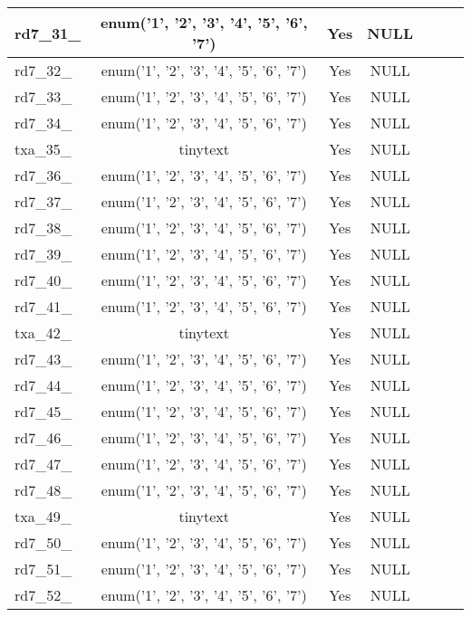 \begin{longtable}{|l|c|c|c|l|l|l|}
rd7\_31\_ & enum('1', '2', '3', '4', '5', '6', '7') & Yes & NULL &  &  &  \\ \hline 
rd7\_32\_ & enum('1', '2', '3', '4', '5', '6', '7') & Yes & NULL &  &  &  \\ \hline 
rd7\_33\_ & enum('1', '2', '3', '4', '5', '6', '7') & Yes & NULL &  &  &  \\ \hline 
rd7\_34\_ & enum('1', '2', '3', '4', '5', '6', '7') & Yes & NULL &  &  &  \\ \hline 
txa\_35\_ & tinytext & Yes & NULL &  &  &  \\ \hline 
rd7\_36\_ & enum('1', '2', '3', '4', '5', '6', '7') & Yes & NULL &  &  &  \\ \hline 
rd7\_37\_ & enum('1', '2', '3', '4', '5', '6', '7') & Yes & NULL &  &  &  \\ \hline 
rd7\_38\_ & enum('1', '2', '3', '4', '5', '6', '7') & Yes & NULL &  &  &  \\ \hline 
rd7\_39\_ & enum('1', '2', '3', '4', '5', '6', '7') & Yes & NULL &  &  &  \\ \hline 
rd7\_40\_ & enum('1', '2', '3', '4', '5', '6', '7') & Yes & NULL &  &  &  \\ \hline 
rd7\_41\_ & enum('1', '2', '3', '4', '5', '6', '7') & Yes & NULL &  &  &  \\ \hline 
txa\_42\_ & tinytext & Yes & NULL &  &  &  \\ \hline 
rd7\_43\_ & enum('1', '2', '3', '4', '5', '6', '7') & Yes & NULL &  &  &  \\ \hline 
rd7\_44\_ & enum('1', '2', '3', '4', '5', '6', '7') & Yes & NULL &  &  &  \\ \hline 
rd7\_45\_ & enum('1', '2', '3', '4', '5', '6', '7') & Yes & NULL &  &  &  \\ \hline 
rd7\_46\_ & enum('1', '2', '3', '4', '5', '6', '7') & Yes & NULL &  &  &  \\ \hline 
rd7\_47\_ & enum('1', '2', '3', '4', '5', '6', '7') & Yes & NULL &  &  &  \\ \hline 
rd7\_48\_ & enum('1', '2', '3', '4', '5', '6', '7') & Yes & NULL &  &  &  \\ \hline 
txa\_49\_ & tinytext & Yes & NULL &  &  &  \\ \hline 
rd7\_50\_ & enum('1', '2', '3', '4', '5', '6', '7') & Yes & NULL &  &  &  \\ \hline 
rd7\_51\_ & enum('1', '2', '3', '4', '5', '6', '7') & Yes & NULL &  &  &  \\ \hline 
rd7\_52\_ & enum('1', '2', '3', '4', '5', '6', '7') & Yes & NULL &  &  &  \\ \hline 

\end{longtable}
